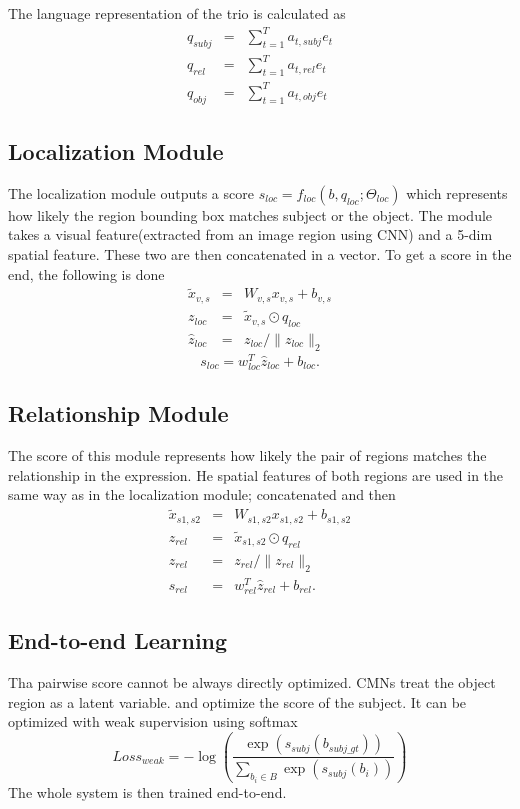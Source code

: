 \documentclass{article}
\begin{document}
	The language representation of the trio is calculated as
	\begin{eqnarray}
	q_{subj} &=& \sum_{t=1}^T a_{t, subj} e_t  \\
	q_{rel} &=& \sum_{t=1}^T a_{t, rel} e_t \ \\
	q_{obj} &=& \sum_{t=1}^T a_{t, obj} e_t 
	\end{eqnarray}
	
	\subsection{Localization Module}
	The localization module outputs a score  $s_{loc} = f_{loc}(b, q_{loc}; \Theta_{loc})$  which represents how likely the region bounding box matches subject or the object. The module takes a visual feature(extracted from an image region using CNN) and a 5-dim spatial feature. These two are then concatenated in a vector. To get a score in the end, the following is done
	\begin{eqnarray}
	\tilde{x}_{v,s} &=& W_{v,s} x_{v,s} + b_{v,s} \\
	z_{loc} &=& \tilde{x}_{v,s} \odot q_{loc} \\
	\hat{z}_{loc} &=& z_{loc} / \|z_{loc}\|_2
	\end{eqnarray}
	\begin{equation}
	s_{loc} = w_{loc}^T \hat{z}_{loc} + b_{loc}.
	\end{equation}
	\subsection{Relationship Module}
	The score of this module represents how likely the pair of regions matches the relationship in the expression. He spatial features of both regions are used in the same way as in the localization module; concatenated and then
	\begin{eqnarray}
	\tilde{x}_{s1,s2} &=& W_{s1,s2} x_{s1,s2} + b_{s1,s2} \\
	z_{rel} &=& \tilde{x}_{s1,s2} \odot q_{rel} \\
	\hat{z}_{rel} &=& z_{rel} / \|z_{rel}\|_2 \\
	s_{rel} &=& w_{rel}^T \hat{z}_{rel} + b_{rel}.
	\end{eqnarray}
	\subsection{End-to-end Learning}
	Tha pairwise score cannot be always directly optimized. CMNs treat the object region as a latent variable. and optimize the score of the subject. It can be optimized with weak supervision using softmax
	\begin{equation}
	Loss_{weak} = -\log\left(\frac{\exp\left(s_{subj}(b_{subj\_gt})\right)}{\sum_{b_i \in B} \exp\left(s_{subj}(b_i)\right)}\right)
	\end{equation}
	The whole system is then trained end-to-end.
	
	
\end{document}
